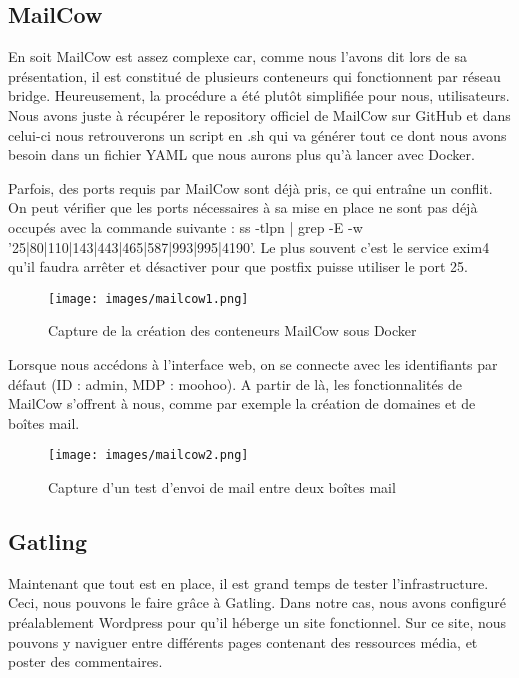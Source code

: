 \documentclass[oneside,12pt]{report}
\begin{document}
\subsection{MailCow}

En soit MailCow est assez complexe car, comme nous l'avons dit lors de sa présentation, il est constitué de plusieurs conteneurs qui fonctionnent par réseau bridge. Heureusement, la procédure a été plutôt simplifiée pour nous, utilisateurs. Nous avons juste à récupérer le repository officiel de MailCow sur GitHub et dans celui-ci nous retrouverons un script en .sh qui va générer tout ce dont nous avons besoin dans un fichier YAML que nous aurons plus qu'à lancer avec Docker. \newline

Parfois, des ports requis par MailCow sont déjà pris, ce qui entraîne un conflit. On peut vérifier que les ports nécessaires à sa mise en place ne sont pas déjà occupés avec la commande suivante : ss -tlpn | grep -E -w '25|80|110|143|443|465|587|993|995|4190'. Le plus souvent c'est le service exim4 qu'il faudra arrêter et désactiver pour que postfix puisse utiliser le port 25.

\begin{figure}[H]
    \centering
    \texttt{[image: images/mailcow1.png]}
    \caption{Capture de la création des conteneurs MailCow sous Docker}
    \label{fig:mesh1}
\end{figure}

Lorsque nous accédons à l'interface web, on se connecte avec les identifiants par défaut (ID : admin, MDP : moohoo). A partir de là, les fonctionnalités de MailCow s'offrent à nous, comme par exemple la création de domaines et de boîtes mail. 

\begin{figure}[H]
    \centering
    \texttt{[image: images/mailcow2.png]}
    \caption{Capture d'un test d'envoi de mail entre deux boîtes mail}
    \label{fig:mesh1}
\end{figure}

\newpage

\subsection{Gatling}

Maintenant que tout est en place, il est grand temps de tester l'infrastructure. Ceci, nous pouvons le faire grâce à Gatling. Dans notre cas, nous avons configuré préalablement Wordpress pour qu'il héberge un site fonctionnel. Sur ce site, nous pouvons y naviguer entre différents pages contenant des ressources média, et poster des commentaires. \newline
\end{document}
